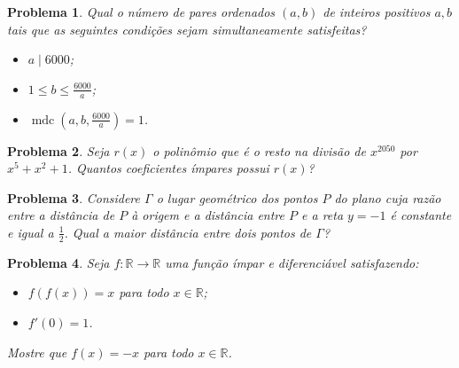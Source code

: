 \documentclass{hipatia}
\newtheorem{problem*}{Problema}
\begin{document}
\begin{problem*}
Qual o número de pares ordenados $(a,b)$ de inteiros positivos $a, b$ tais que as seguintes condições sejam simultaneamente satisfeitas?


\begin{itemize}
    \item [$(i)$]  
    $a\mid 6000$;
    \item [$(ii)$] 
    $1\le b \le \frac{6000}{a}$;
     \item [$(ii)$]
     $\operatorname{mdc}(a, b,\frac{6000}{a}) = 1$.
\end{itemize}
\end{problem*}

\begin{problem*}
Seja $r(x)$ o polinômio que é o resto na divisão de $x^{2050}$ por $x^5 + x^2  +1$.  Quantos coeficientes ímpares possui $r(x)$?
\end{problem*}



\begin{problem*}
Considere $\Gamma$ o lugar geométrico dos pontos $P$ do plano cuja razão entre a distância de $P$ à origem e a distância entre $P$ e a reta $y=-1$ é constante e igual a $\frac{1}{2}$. Qual a maior distância entre dois pontos de $\Gamma$?
	
\end{problem*}


\begin{problem*}
Seja $f : \mathbb{R} \rightarrow \mathbb{R}$ uma função ímpar e diferenciável satisfazendo:

\begin{itemize}
    \item $f(f(x)) = x$ para todo $x \in \mathbb{R}$;
    \item $f'(0) = 1$.
\end{itemize}

\noindent Mostre que $f(x) = -x$ para todo $x \in \mathbb{R}$.
	
\end{problem*}
\end{document}

